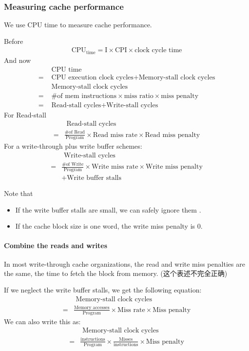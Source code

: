 \subsubsection{Measuring cache performance}
We use CPU time to measure cache performance. 
{\small
Before
\begin{align*}
    \text{CPU}_{\text{time}}=\text{I}\times \text{CPI} \times \text{clock cycle time}
\end{align*}
And now
\begin{align*}
    &\text{ CPU time}\\
    =& \text{ CPU execution clock cycles} +\text{Memory-stall clock cycles}\\
    &\text{ Memory-stall clock cycles}\\
    =&\text{ \# of mem instructions}\times \text{miss ratio}\times \text{miss penalty} \\
    =&\text{ Read-stall cycles} + \text{Write-stall cycles}
\end{align*}
For Read-stall
\begin{align*}
    &\text{ Read-stall cycles}\\
    =& \frac{\text{\# of Read}}{\text{Program}}\times \text{Read miss rate}\times \text{Read miss penalty}
\end{align*}
For a write-through plus write buffer schemes:
\begin{align*}
    &\text{ Write-stall cycles}\\
    =& \frac{\text{\# of Write}}{\text{Program}}\times \text{Write miss rate}\times \text{Write miss penalty}\\
    &+\text{Write buffer stalls}
\end{align*}

}
Note that
\begin{itemize}\small
    \item If the write buffer stalls are small, we can safely ignore them .
    \item If the cache block size is one word, the write miss penalty is 0.
\end{itemize}

\paragraph{Combine the reads and writes}{
    \small
    In most write-through cache organizations, the read and write miss penalties are the same, the time to fetch the block from memory. (这个表述不完全正确)

    If we neglect the write buffer stalls, we get the following equation:
    \begin{align*}
        &\text{ Memory-stall clock cycles}\\
        =& \frac{\text{Memory accesses}}{\text{Program}}\times \text{Miss rate}\times \text{Miss penalty}
    \end{align*}
    We can also write this as:
    \begin{align*}
        &\text{ Memory-stall clock cycles}\\
        =& \frac{\text{instructions}}{\text{Program}}\times \frac{\text{Misses}}{\text{instructions}}\times \text{Miss penalty}
    \end{align*}
}

